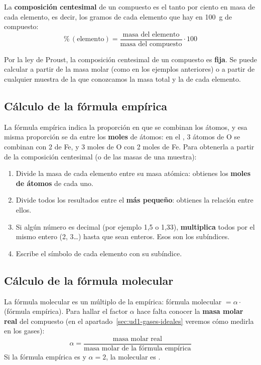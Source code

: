 \begin{definition}
    La \textbf{composición centesimal} de un compuesto es el tanto por ciento en masa de cada elemento, es decir, los gramos de
    cada elemento que hay en \qty{100}{\gram} de compuesto:
    \[ \%\,(\text{elemento}) = \frac{\text{masa del elemento}}{\text{masa del compuesto}} \cdot 100 \]
\end{definition}

Por la ley de Proust, la composición centesimal de un compuesto es \textbf{fija}. Se puede calcular a partir de la masa molar
(como en los ejemplos anteriores) o a partir de cualquier muestra de la que conozcamos la masa total y la de cada elemento.

\subsection{Cálculo de la fórmula empírica}

La fórmula empírica indica la proporción en que se combinan los átomos, y esa misma proporción se da entre los
\textbf{moles} de átomos: en el , 3 átomos de O se combinan con 2 de Fe, y 3 moles de O con 2 moles de Fe. Para
obtenerla a partir de la composición centesimal (o de las masas de una muestra):

\begin{enumerate}[label=\numberballblue]
    \item Divide la masa de cada elemento entre su masa atómica: obtienes los \textbf{moles de átomos} de cada uno.
    \item Divide todos los resultados entre el \textbf{más pequeño}: obtienes la relación entre ellos.
    \item Si algún número es decimal (por ejemplo 1,5 o 1,33), \textbf{multiplica} todos por el mismo entero (2, 3…) hasta que
    sean enteros. Esos son los subíndices.
    \item Escribe el símbolo de cada elemento con su subíndice.
\end{enumerate}

\subsection{Cálculo de la fórmula molecular}

La fórmula molecular es un múltiplo de la empírica: fórmula molecular \(= \alpha \cdot{}\)(fórmula empírica).
Para hallar el factor \(\alpha\) hace falta conocer la \textbf{masa molar real} del compuesto (en el apartado~\ref{sec:ud1-gases-ideales}
veremos cómo medirla en los gases):
\[ \alpha = \frac{\text{masa molar real}}{\text{masa molar de la fórmula empírica}} \]
Si la fórmula empírica es  y \(\alpha = 2\), la molecular es .


